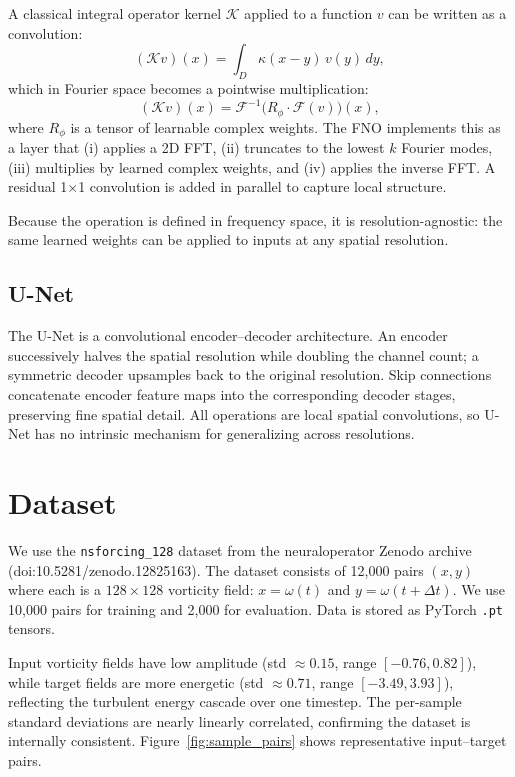 \documentclass[sigconf,nonacm]{acmart}
\begin{document}
A classical integral operator kernel $\mathcal{K}$ applied to a function $v$ can
be written as a convolution:
\begin{equation}
  (\mathcal{K}v)(x) = \int_D \kappa(x - y)\, v(y)\,dy,
\end{equation}
which in Fourier space becomes a pointwise multiplication:
\begin{equation}
  (\mathcal{K}v)(x) = \mathcal{F}^{-1}\!\bigl(R_\phi \cdot \mathcal{F}(v)\bigr)(x),
\end{equation}
where $R_\phi$ is a tensor of learnable complex weights.
The FNO implements this as a layer that (i) applies a 2D FFT, (ii) truncates to
the lowest $k$ Fourier modes, (iii) multiplies by learned complex weights, and
(iv) applies the inverse FFT.
A residual 1$\times$1 convolution is added in parallel to capture local structure.

Because the operation is defined in frequency space, it is resolution-agnostic:
the same learned weights can be applied to inputs at any spatial resolution.

\subsection{U-Net}

The U-Net \cite{ronneberger2015unet} is a convolutional encoder--decoder
architecture.
An encoder successively halves the spatial resolution while doubling the channel
count; a symmetric decoder upsamples back to the original resolution.
Skip connections concatenate encoder feature maps into the corresponding decoder
stages, preserving fine spatial detail.
All operations are local spatial convolutions, so U-Net has no intrinsic mechanism
for generalizing across resolutions.

\section{Dataset}
\label{sec:dataset}

We use the \texttt{nsforcing\_128} dataset from the neuraloperator Zenodo
archive \cite{zenodo2024} (doi:10.5281/zenodo.12825163).
The dataset consists of 12{,}000 pairs $(x, y)$ where each is a
$128\times 128$ vorticity field: $x = \omega(t)$ and $y = \omega(t + \Delta t)$.
We use 10{,}000 pairs for training and 2{,}000 for evaluation.
Data is stored as PyTorch \texttt{.pt} tensors.

Input vorticity fields have low amplitude (std $\approx 0.15$, range $[-0.76,
0.82]$), while target fields are more energetic (std $\approx 0.71$, range
$[-3.49, 3.93]$), reflecting the turbulent energy cascade over one timestep.
The per-sample standard deviations are nearly linearly correlated, confirming
the dataset is internally consistent.
Figure~\ref{fig:sample_pairs} shows representative input--target pairs.
\end{document}
